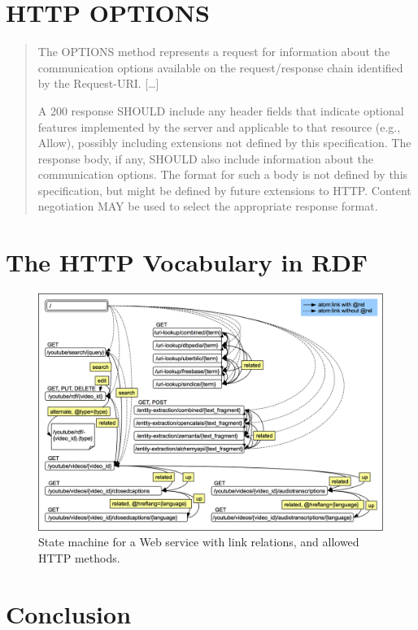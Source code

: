 \documentclass{acm_proc_article-sp}
\begin{document}
\section{HTTP OPTIONS}\label{sec:httpoptions}
\begin{quote}
The OPTIONS method represents a request for information about the communication options available on the request/response chain identified by the Request-URI. [\ldots]

A 200 response SHOULD include any header fields that indicate optional features implemented by the server and applicable to that resource (e.g., Allow), possibly including extensions not defined by this specification. The response body, if any, SHOULD also include information about the communication options. The format for such a body is not defined by this specification, but might be defined by future extensions to HTTP. Content negotiation MAY be used to select the appropriate response format.
\end{quote} \cite{HTTP:Spec}

\section{The HTTP Vocabulary in RDF}\label{sec:httpvocab}
\cite{HTTP:RDF}

\begin{figure}
 \centering
 \includegraphics[width=\linewidth]{statemachine.png}
 \caption{State machine for a Web service with link relations, and allowed HTTP methods.}
 \label{fig:statemachine}
\end{figure}

\section{Conclusion}\label{sec:conclusion}
\end{document}
